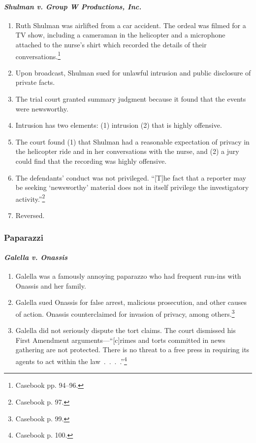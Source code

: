 
\paragraph{\emph{Shulman v. Group W Productions, Inc.}}

\begin{enumerate}
    \item Ruth Shulman was airlifted from a car accident. The ordeal was filmed 
    for a TV show, including a cameraman in the helicopter and a microphone 
    attached to the nurse's shirt which recorded the details of their 
    conversations.\footnote{Casebook pp. 94--96.}
    \item Upon broadcast, Shulman sued for unlawful intrusion and public 
    disclosure of private facts.
    \item The trial court granted summary judgment because it found that the 
    events were newsworthy.
    \item Intrusion has two elements: (1) intrusion (2) that is highly 
    offensive.
    \item The court found (1) that Shulman had a reasonable expectation of 
    privacy in the helicopter ride and in her conversations with the nurse, and 
    (2) a jury could find that the recording was highly offensive.
    \item The defendants' conduct was not privileged. ``[T]he fact that a 
    reporter may be seeking `newsworthy' material does not in itself privilege 
    the investigatory activity.''\footnote{Casebook p. 97.}
    \item Reversed.
\end{enumerate}

\subsubsection{Paparazzi}

\paragraph{\emph{Galella v. Onassis}}

\begin{enumerate}
    \item Galella was a famously annoying paparazzo who had frequent run-ins 
    with Onassis and her family.
    \item Galella sued Onassis for false arrest, malicious prosecution, and 
    other causes of action. Onassis counterclaimed for invasion of privacy, 
    among others.\footnote{Casebook p. 99.}
    \item Galella did not seriously dispute the tort claims. The court dismissed 
    his First Amendment arguments---``[c]rimes and torts committed in news 
    gathering are not protected. There is no threat to a free press in requiring 
    its agents to act within the law~.~.~.~.''\footnote{Casebook p. 100.}
\end{enumerate}

